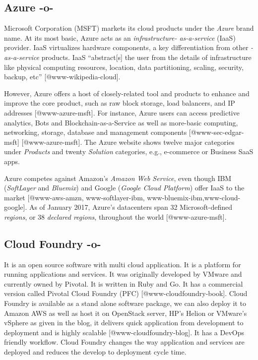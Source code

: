 \subsection{Azure -o-}

Microsoft Corporation (MSFT) markets its cloud products under the
\textit{Azure} brand name. At its most basic, Azure acts as an
\textit{infrastructure- as-a-service} (IaaS) provider.  IaaS virtualizes
hardware components, a key differentiation from other \textit{-as-a-service}
products. IaaS ``abstract[s] the user from the details of
infrastructure like physical computing resources, location, data
partitioning, scaling, security, backup,
etc'' [@www-wikipedia-cloud].

However, Azure offers a host of closely-related tool and products to
enhance and improve the core product, such as raw block storage, load
balancers, and IP addresses [@www-azure-msft]. For instance, Azure
users can access predictive analytics, Bots and
Blockchain-as-a-Service as well as more-basic computing, networking,
storage, database and management
components [@www-sec-edgar-msft] [@www-azure-msft].  The Azure
website shows twelve major categories under \textit{Products} and twenty
\textit{Solution} categories, e.g., e-commerce or Business SaaS apps.

Azure competes against Amazon's \textit{Amazon Web Service}, even though IBM
(\textit{SoftLayer} and \textit{Bluemix}) and Google (\textit{Google Cloud Platform})
offer IaaS to the market [@www-aws-amzn, www-softlayer-ibm,
  www-bluemix-ibm,www-cloud-google].  As of January 2017, Azure's
datacenters span 32 Microsoft-defined \textit{regions}, or 38 \textit{declared
regions}, throughout the world [@www-azure-msft].



\subsection{Cloud Foundry -o-}

It is an open source software with multi cloud application. It is a
platform for running applications and services. It was originally
developed by VMware and currently owned by Pivotal. It is written in
Ruby and Go. It has a commercial version called Pivotal Cloud Foundry
(PFC) [@www-cloudfoundry-book]. Cloud Foundry is available as a
stand alone software package, we can also deploy it to Amazon AWS as
well as host it on OpenStack server, HP's Helion or VMware's vSphere
as given in the blog, it delivers quick application from development
to deployment and is highly scalable [@www-cloudfoundry-blog]. It
has a DevOps friendly workflow.  Cloud Foundry changes the way
application and services are deployed and reduces the develop to
deployment cycle time.



